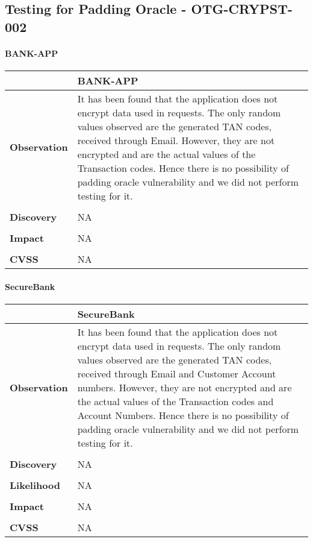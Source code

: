 \subsection{Testing for Padding Oracle - OTG-CRYPST-002}
\paragraph{BANK-APP} \mbox{}
\begin{longtable*}{p{.20\textwidth} | p{.80\textwidth}}
	\hline
	& \textbf{BANK-APP} \\
	\hline
	\textbf{Observation} &
	It has been found that the application does not encrypt data used in requests. The only random values observed are the generated TAN codes, received through Email. However, they are not encrypted and are the actual values of the Transaction codes. Hence there is no possibility of padding oracle vulnerability and we did not perform testing for it. 
	\\\\
	\textbf{Discovery} &
	NA
	\\\\
	\textbf{Impact} &
	NA
	\\\\
	\textbf{CVSS} &
	NA
	\\
	\hline
\end{longtable*}
\paragraph{SecureBank} \mbox{}
\begin{longtable*}{p{.20\textwidth} | p{.80\textwidth}}
	\hline
	& \textbf{SecureBank} \\
	\hline
	\textbf{Observation} &
	It has been found that the application does not encrypt data used in requests. The only random values observed are the generated TAN codes, received through Email and Customer Account numbers. However, they are not encrypted and are the actual values of the Transaction codes and Account Numbers. Hence there is no possibility of padding oracle vulnerability and we did not perform testing for it. 
	\\\\
	\textbf{Discovery} &
	NA
	\\\\ 
	\textbf{Likelihood} &
	NA
	\\\\
	\textbf{Impact} &
	NA
	\\\\
	\textbf{CVSS} &
	NA
	\\
	\hline
\end{longtable*}
\clearpage